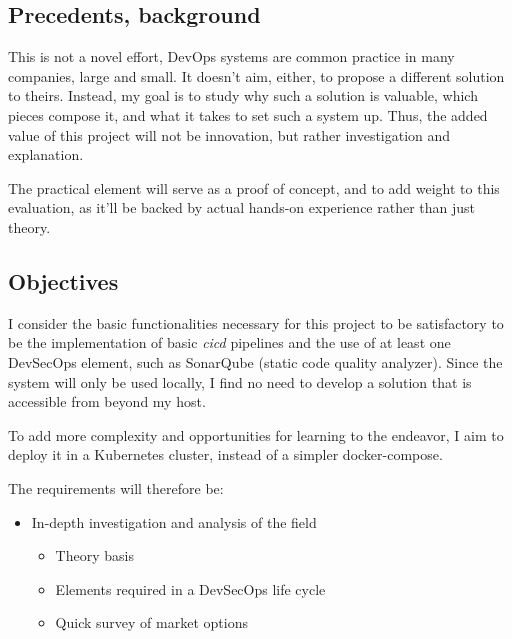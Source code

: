 \documentclass[11pt]{article}
\begin{document}
\begin{flushleft}
    \bigskip
    \bigskip
    \subsection{Precedents, background}
    This is not a novel effort, DevOps systems are common practice in many companies, large and small. It doesn't aim, either, to propose a different solution to theirs. Instead, my goal is to study why such a solution is valuable, which pieces compose it, and what it takes to set such a system up. Thus, the added value of this project will not be innovation, but rather investigation and explanation. 
    \linebreak
    
    The practical element will serve as a proof of concept, and to add weight to this evaluation, as it'll be backed by actual hands-on experience rather than just theory.
    \linebreak
    
    \bigskip
    \bigskip
    \subsection{Objectives}
    I consider the basic functionalities necessary for this project to be satisfactory to be the implementation of basic \textit{\acrshort{cicd}} pipelines and the use of at least one DevSecOps element, such as SonarQube (static code quality analyzer). Since the system will only be used locally, I find no need to develop a solution that is accessible from beyond my host. 
    \linebreak
    
    To add more complexity and opportunities for learning to the endeavor, I aim to deploy it in a Kubernetes cluster, instead of a simpler docker-compose.
    \linebreak
    
    The requirements will therefore be:
    \begin{itemize}
        \itemsep0em 
        \item In-depth investigation and analysis of the field
            \begin{itemize}
                \itemsep0em 
                \item[\ding{118}] Theory basis
                
                \item[\ding{118}] Elements required in a DevSecOps life cycle

                \item[\ding{118}] Quick survey of market options
            \end{itemize}
            

\end{itemize}
\end{flushleft}
\end{document}
